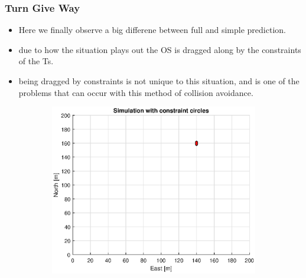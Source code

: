 \subsubsection{Turn Give Way}
\begin{itemize}
    \item Here we finally observe a big differene between full and simple prediction.
    \item due to how the situation plays out the \gls{OS} is dragged along by the constraints of the \gls{Ts}.
    \item being dragged by constraints is not unique to this situation, and is one of the problems that can occur
    with this method of collision avoidance.
\end{itemize}
\clearpage
\begin{figure}[!b] %
    \begin{subfigure}[b]{0.49\textwidth}
        \centering
        \includegraphics[width=\textwidth]{Images/Figures/sving_GW/Simple0_f1_Frame1}
    \end{subfigure}
    \hfill
    \begin{subfigure}[b]{0.499\textwidth}
        \centering

\end{subfigure}
\end{figure}
